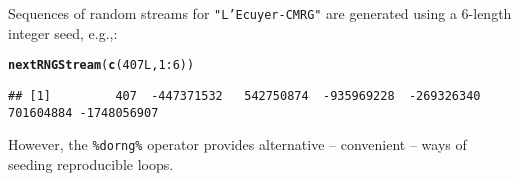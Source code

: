 \documentclass[a4paper,12pt]{article}\usepackage{graphicx, color}
\makeatletter
\newcommand{\hlfunctioncall}[1]{\textcolor[rgb]{0.501960784313725,0,0.329411764705882}{\textbf{#1}}}%
\newenvironment{kframe}{%
 \def\at@end@of@kframe{}%
 \ifinner\ifhmode%
  \def\at@end@of@kframe{\end{minipage}}%
  \begin{minipage}{\columnwidth}%
 \fi\fi%
 \def\FrameCommand##1{\hskip\@totalleftmargin \hskip-\fboxsep
 \colorbox{shadecolor}{##1}\hskip-\fboxsep
     \hskip-\linewidth \hskip-\@totalleftmargin \hskip\columnwidth}%
 \MakeFramed {\advance\hsize-\width
   \@totalleftmargin\z@ \linewidth\hsize
   \@setminipage}}%
 {\par\unskip\endMakeFramed%
 \at@end@of@kframe}
\newenvironment{knitrout}{}{} %
\renewenvironment{knitrout}{\begin{footnotesize}}{\end{footnotesize}}
\let\code=\texttt
\makeatother
\begin{document}
Sequences of random streams for \code{"L'Ecuyer-CMRG"} are generated
using a 6-length integer seed, e.g.,:
\begin{knitrout}
\color{fgcolor}\begin{kframe}
\begin{alltt}
\hlfunctioncall{nextRNGStream}(\hlfunctioncall{c}(407L, 1:6))
\end{alltt}
\begin{verbatim}
## [1]         407  -447371532   542750874  -935969228  -269326340   701604884 -1748056907
\end{verbatim}
\end{kframe}
\end{knitrout}


However, the \code{\%dorng\%} operator provides alternative -- convenient --
ways of seeding reproducible loops.
\end{document}
